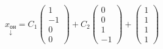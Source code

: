 \documentclass[../main.tex]{subfiles}
\begin{document}
$\underset{\downarrow}{x_{\text{он}}}=C_{1}\begin{pmatrix}
    1\\ 
    -1\\
    0\\
    0
\end{pmatrix}+C_{2}\begin{pmatrix}
    0\\ 
    0\\
    1\\
    -1
\end{pmatrix}+\begin{pmatrix}
    1\\ 
    1\\
    1\\
    1
\end{pmatrix}$
\end{document}
